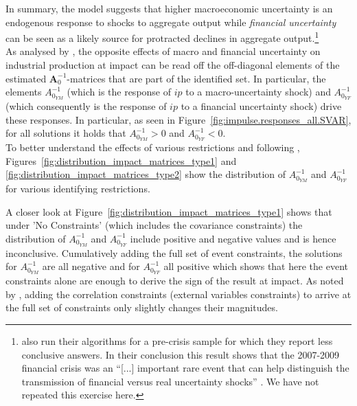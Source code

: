 \documentclass[a4paper,11pt,listof=nochaptergap,oneside,pointednumbers,bibtotoc,bigheadings,liststotoc,hidelinks]{scrbook}
\theoremstyle{mysatz}
\theoremstyle{mydefinition}
\theoremstyle{mytheorem}
\theoremstyle{mybemerkung}
\newcommand{\vect}[1]{\boldsymbol{\mathbf{#1}}}
\begin{document}
In summary, the model suggests that higher macroeconomic uncertainty is an endogenous response to shocks to aggregate output while \textit{financial uncertainty} can be seen as a likely source for protracted declines in aggregate output.\footnote{\citet{ludvigsonetal:18} also run their algorithms for a pre-crisis sample for which they report less conclusive answers. In their conclusion this result shows that the 2007-2009 financial crisis was an ``[...] important rare event that can help distinguish the transmission of financial versus real uncertainty shocks'' \citet[p. 25]{ludvigsonetal:18}. We have not repeated this exercise here.}\\


As analysed by \citet{ludvigsonetal:19}, the opposite effects of macro and financial uncertainty on industrial production at impact can be read off the off-diagonal elements of the estimated $\vect{A}_0^{-1}$-matrices that are part of the identified set. In particular, the elements $A_{0_{YM}}^{-1}$ (which is the response of $ip$ to a macro-uncertainty shock) and $A_{0_{YF}}^{-1}$ (which consequently is the response of $ip$ to a financial uncertainty shock) drive these responses. In particular, as seen in Figure~\ref{fig:impulse.responses_all.SVAR}, for all solutions it holds that $A_{0_{YM}}^{-1} > 0$ and $A_{0_{YF}}^{-1} < 0$.\\

To better understand the effects of various restrictions and following \citet{ludvigsonetal:19}, Figures~\ref{fig:distribution_impact_matrices_type1} and \ref{fig:distribution_impact_matrices_type2} show the distribution of $A_{0_{YM}}^{-1}$ and $A_{0_{YF}}^{-1}$ for various identifying restrictions.

A closer look at Figure~\ref{fig:distribution_impact_matrices_type1} shows that under 'No Constraints' (which includes the covariance constraints) the distribution of $A_{0_{YM}}^{-1}$ and $A_{0_{YF}}^{-1}$ include positive and negative values and is hence inconclusive. Cumulatively adding the full set of event constraints, the solutions for $A_{0_{YM}}^{-1}$ are all negative and for $A_{0_{YF}}^{-1}$ all positive which shows that here the event constraints alone are enough to derive the sign of the result at impact. As noted by \citet{ludvigsonetal:19}, adding the correlation constraints (external variables constraints) to arrive at the full set of constraints only slightly changes their magnitudes. 
\end{document}
